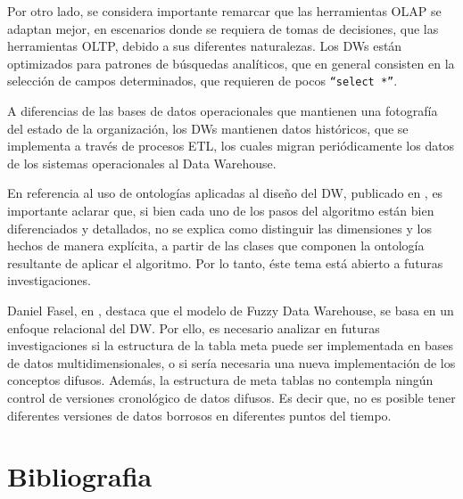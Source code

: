 \documentclass[a4paper,11pt]{article}
\begin{document}
  Por otro lado, se considera importante remarcar que las herramientas OLAP se adaptan mejor, en escenarios donde se requiera de tomas de decisiones,
  que las herramientas OLTP, debido a sus diferentes naturalezas.
  Los DWs están optimizados para patrones de búsquedas analíticos, que en general consisten en la selección de campos determinados, que requieren de pocos
  \texttt{``select *''}.
  
  A diferencias de las bases de datos operacionales que mantienen una fotografía del estado
  de la organización, los DWs mantienen datos históricos, que se implementa a través de procesos ETL, los cuales migran periódicamente los datos de los sistemas
  operacionales al Data Warehouse.
  
  En referencia al uso de ontologías aplicadas al diseño del DW, publicado en \cite{ontologias}, es importante aclarar que, si bien cada uno de los pasos del
  algoritmo están bien diferenciados y detallados, no se explica como distinguir las dimensiones y los hechos de manera explícita, a partir de las clases
  que componen la ontología resultante de aplicar el algoritmo. Por lo tanto, éste tema está abierto a futuras investigaciones.
  
  Daniel Fasel, en \cite {Fasel14}, destaca que el modelo de Fuzzy Data Warehouse, se basa en un enfoque relacional del DW.
  Por ello, es necesario analizar en futuras investigaciones si la estructura de la tabla meta puede ser implementada en bases de datos multidimensionales,
  o si sería necesaria una nueva implementación de los conceptos difusos.
  Además, la estructura de meta tablas no contempla ningún control de versiones cronológico de datos difusos.
  Es decir que, no es posible tener diferentes versiones de datos borrosos en diferentes puntos del tiempo.
  


  \section{Bibliografia}

  \printbibliography

  
  
  \printindex %
  
\end{document}

